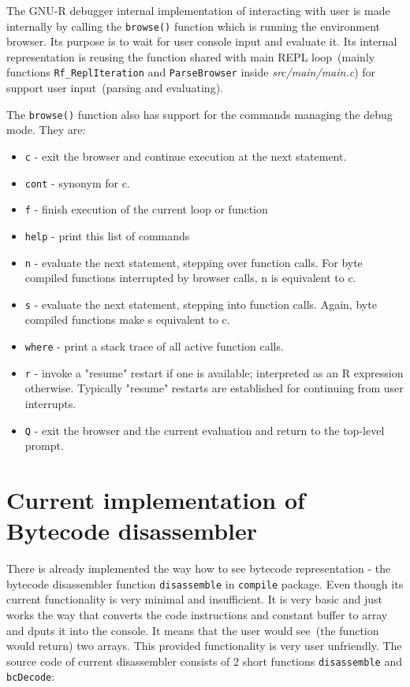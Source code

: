 \documentclass[thesis=M,english]{FITthesis}[2018/10/20]
\newcommand{\code}[1]{\texttt{#1}}
\begin{document}
The GNU-R debugger internal implementation of interacting with user is made internally by calling the \code{browse()} function which is running the environment browser. Its purpose is to wait for user console input and evaluate it. Its internal representation is reusing the function shared with main REPL loop~(mainly functions \code{Rf{\_}ReplIteration} and \code{ParseBrowser} inside \textit{src/main/main.c}) for support user input~(parsing and evaluating).

The \code{browse()} function also has support for the commands managing the debug mode. They are:
\begin{itemize}
\item \code{c} - exit the browser and continue execution at the next statement.
\item \code{cont} - synonym for c.
\item \code{f} - finish execution of the current loop or function
\item \code{help} - print this list of commands
\item \code{n} - evaluate the next statement, stepping over function calls. For byte compiled functions  interrupted by browser calls, n is equivalent to c.
\item \code{s} - evaluate the next statement, stepping into function calls. Again, byte compiled functions make s equivalent to c.
\item \code{where} - print a stack trace of all active function calls.
\item \code{r} - invoke a "resume" restart if one is available; interpreted as an R expression otherwise. Typically "resume" restarts are established for continuing from user interrupts.
\item \code{Q} - exit the browser and the current evaluation and return to the top-level prompt.

\end{itemize}

\section{Current implementation of Bytecode disassembler}\label{current-bc-disassembler}

There is already implemented the way how to see bytecode representation - the bytecode disassembler function \code{disassemble} in \code{compile} package. Even though its current functionality is very minimal and insufficient. It is very basic and just works the way that converts the code instructions and constant buffer to array and dputs it into the console. It means that the user would see~(the function would return) two arrays. This provided functionality is very user unfriendly. The source code of current disassembler consists of 2 short functions \code{disassemble} and \code{bcDecode}:
\end{document}
